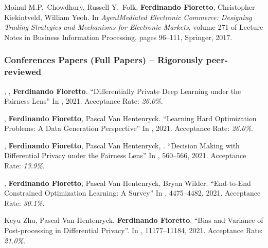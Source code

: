 \item
	Moinul M.P.~Chowdhury, Russell Y.~Folk, {\bf Ferdinando Fioretto}, Christopher Kiekintveld, William Yeoh. 
	In \emph{AgentMediated Electronic Commerce: Designing Trading Strategies and Mechanisms for Electronic Markets}, volume 271 of Lecture Notes in Business Information Processing, 
    pages 96–111, Springer, 2017.
\endEnum



\subsubsection*{\sc Conferences Papers (Full Papers) -- Rigorously peer-reviewed}
\renewcommand{\labelenumi}{c\theenumi.} 
\beginEnum
  \setcounter{enumi}{43}

	\item {}, , {\bf Ferdinando Fioretto}.
	{``Differentially Private Deep Learning under the Fairness Lens''}
	In \procNeurIPS, 2021.
	Acceptance Rate: {\it 26.0\%}. %

	\item {}, {\bf Ferdinando Fioretto}, Pascal Van Hentenryck.
	{``Learning Hard Optimization Problems: A Data Generation Perspective''}
	In \procNeurIPS, 2021.
	Acceptance Rate: {\it 26.0\%}. %

	\item {}, {\bf Ferdinando Fioretto}, Pascal Van Hentenryck, .
	{``Decision Making with Differential Privacy under the Fairness Lens''}
	In \procIJCAI, 560--566, 2021.
	Acceptance Rate: {\it 13.9\%}. %

	\item {}, {\bf Ferdinando Fioretto}, Pascal Van Hentenryck, Bryan Wilder.
	{``End-to-End Constrained Optimization Learning: A Survey''}
	In \procIJCAI, 4475--4482, 2021.
	Acceptance Rate: {\it 30.1\%}.

	\item Keyu Zhu, Pascal Van Hentenryck, {\bf Ferdinando Fioretto}.
	{``Bias and Variance of Post-processing in Differential Privacy''}.
	In \procAAAI, 11177--11184, 2021.
    Acceptance Rate: {\it 21.0\%}. %

